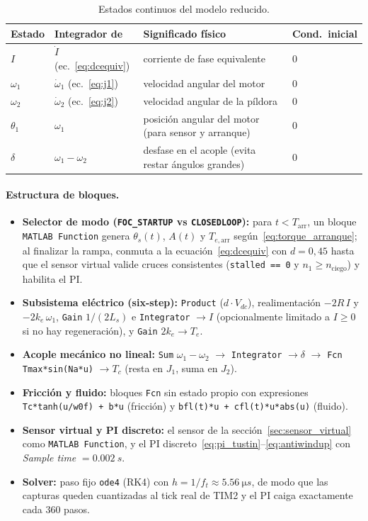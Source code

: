 \documentclass[11pt,a4paper,oneside]{report}
\theoremstyle{definition}
\theoremstyle{remark}
\begin{document}
\begin{table}[h]
\centering
\small
\begin{tabular}{@{}llll@{}}
\toprule
Estado & Integrador de & Significado físico & Cond.\ inicial \\
\midrule
$I$ & $\dot I$ (ec.~\eqref{eq:dcequiv}) & corriente de fase equivalente & $0$ \\
$\omega_1$ & $\dot\omega_1$ (ec.~\eqref{eq:j1}) & velocidad angular del motor & $0$ \\
$\omega_2$ & $\dot\omega_2$ (ec.~\eqref{eq:j2}) & velocidad angular de la píldora & $0$ \\
$\theta_1$ & $\omega_1$ & posición angular del motor (para sensor y arranque) & $0$ \\
$\delta$ & $\omega_1 - \omega_2$ & desfase en el acople (evita restar ángulos grandes) & $0$ \\
\bottomrule
\end{tabular}
\caption{Estados continuos del modelo reducido.}
\end{table}

\paragraph{Estructura de bloques.}
\begin{itemize}
  \item \textbf{Selector de modo (\texttt{FOC\_STARTUP} vs \texttt{CLOSEDLOOP}):}
        para $t < T_{\text{arr}}$, un bloque \texttt{MATLAB Function} genera
        $\theta_s(t)$, $A(t)$ y $T_{e,\text{arr}}$ según~\eqref{eq:torque_arranque};
        al finalizar la rampa, conmuta a la ecuación~\eqref{eq:dcequiv} con
        $d = 0{,}45$ hasta que el sensor virtual valide cruces consistentes
        (\texttt{stalled == 0} y $n_1 \ge n_{\text{ciego}}$) y habilita el PI.
  \item \textbf{Subsistema eléctrico (six-step):} \texttt{Product} ($d\cdot V_{dc}$),
        realimentación $-2R\,I$ y $-2k_e\,\omega_1$, \texttt{Gain} $1/(2L_s)$
        e \texttt{Integrator} $\to I$ (opcionalmente limitado a $I\ge 0$ si no
        hay regeneración), y \texttt{Gain} $2k_e \to T_e$.
  \item \textbf{Acople mecánico no lineal:} \texttt{Sum} $\omega_1-\omega_2$
        $\to$ \texttt{Integrator} $\to \delta$ $\to$ \texttt{Fcn}
        \verb|Tmax*sin(Na*u)| $\to T_c$ (resta en $J_1$, suma en $J_2$).
  \item \textbf{Fricción y fluido:} bloques \texttt{Fcn} sin estado propio con
        expresiones \verb|Tc*tanh(u/w0f) + b*u| (fricción) y
        \verb|bfl(t)*u + cfl(t)*u*abs(u)| (fluido).
  \item \textbf{Sensor virtual y PI discreto:} el sensor de la
        sección~\ref{sec:sensor_virtual} como \texttt{MATLAB Function}, y el PI
        discreto~\eqref{eq:pi_tustin}--\eqref{eq:antiwindup} con \emph{Sample time}
        $= \SI{0,002}{s}$.
  \item \textbf{Solver:} paso fijo \texttt{ode4} (RK4) con $h = 1/f_t \approx \SI{5,56}{\micro s}$,
        de modo que las capturas queden cuantizadas al tick real de TIM2 y el
        PI caiga exactamente cada 360 pasos.
\end{itemize}
\end{document}
